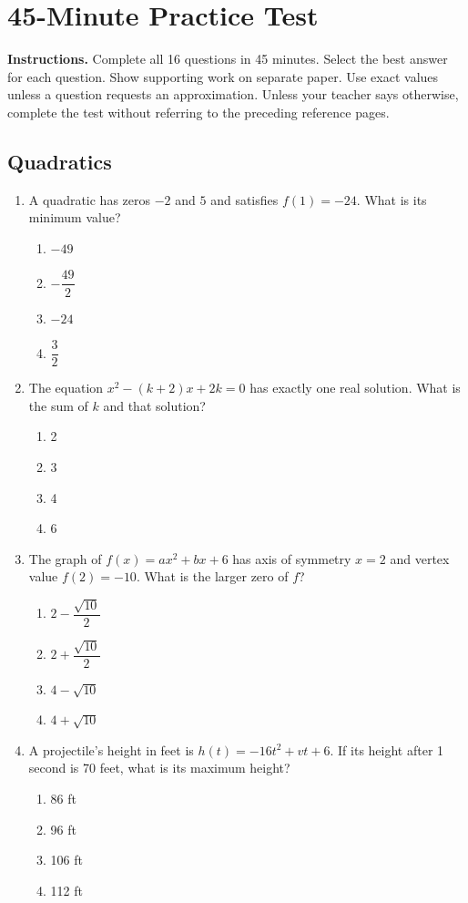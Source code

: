\documentclass[12pt]{article}
\begin{document}
\clearpage
\section*{45-Minute Practice Test}
\textbf{Instructions.} Complete all 16 questions in 45 minutes. Select the best answer for each question. Show supporting work on separate paper. Use exact values unless a question requests an approximation. Unless your teacher says otherwise, complete the test without referring to the preceding reference pages.

\subsection*{Quadratics}
\begin{enumerate}[leftmargin=*,itemsep=1em]
  \item A quadratic has zeros $-2$ and $5$ and satisfies $f(1)=-24$. What is its minimum value?
  \begin{enumerate}[label=\Alph*.,itemsep=0pt]
    \item $-49$ \item $-\dfrac{49}{2}$ \item $-24$ \item $\dfrac32$
  \end{enumerate}

  \item The equation $x^2-(k+2)x+2k=0$ has exactly one real solution. What is the sum of $k$ and that solution?
  \begin{enumerate}[label=\Alph*.,itemsep=0pt]
    \item 2 \item 3 \item 4 \item 6
  \end{enumerate}

  \item The graph of $f(x)=ax^2+bx+6$ has axis of symmetry $x=2$ and vertex value $f(2)=-10$. What is the larger zero of $f$?
  \begin{enumerate}[label=\Alph*.,itemsep=0pt]
    \item $2-\dfrac{\sqrt{10}}2$ \item $2+\dfrac{\sqrt{10}}2$
    \item $4-\sqrt{10}$ \item $4+\sqrt{10}$
  \end{enumerate}

  \item A projectile's height in feet is $h(t)=-16t^2+vt+6$. If its height after 1 second is 70 feet, what is its maximum height?
  \begin{enumerate}[label=\Alph*.,itemsep=0pt]
    \item 86 ft \item 96 ft \item 106 ft \item 112 ft
  \end{enumerate}
\end{enumerate}
\end{document}
